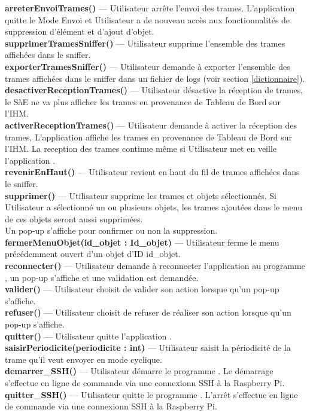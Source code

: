 \textbf{arreterEnvoiTrames()} --- Utilisateur arrête l'envoi des trames. L'application {\nomApplication} quitte le {\guillemotleft} Mode Envoi {\guillemotright} et Utilisateur a de nouveau accès aux fonctionnalités de suppression d'élément et d'ajout d'objet.\\
\textbf{supprimerTramesSniffer()} --- Utilisateur supprime l'ensemble des trames affichées dans le sniffer. \\
\textbf{exporterTramesSniffer()} --- Utilisateur demande à exporter l'ensemble des trames affichées dans le sniffer dans un fichier de logs (voir section \ref{dictionnaire}). \\
\textbf{desactiverReceptionTrames()} --- Utilisateur désactive la réception de trames, le SàE ne va plus afficher les trames en provenance de Tableau de Bord sur l'IHM. \\
\textbf{activerReceptionTrames()} --- Utilisateur demande à activer la réception des trames, L'application {\nomApplication} affiche les trames en provenance de Tableau de Bord sur l'IHM. La reception des trames continue même si Utilisateur met en veille l'application {\nomApplication}. \\
\textbf{revenirEnHaut()} --- Utilisateur revient en haut du fil de trames affichées dans le sniffer. \\
\textbf{supprimer()} --- Utilisateur supprime les trames et objets sélectionnés. Si Utilisateur a sélectionné un ou plusieurs objets, les trames ajoutées dans le menu de ces objets seront aussi supprimées. \\
Un pop-up s'affiche pour confirmer ou non la suppression. \\
\textbf{fermerMenuObjet(id\_objet : Id\_objet)} --- Utilisateur ferme le menu précédemment ouvert d'un objet d'ID id\_objet. \\
\textbf{reconnecter()} --- Utilisateur demande à reconnecter l'application {\nomApplication} au programme {\nomLogiciel}, un pop-up s'affiche et une validation est demandée. \\
\textbf{valider()} --- Utilisateur choisit de valider son action lorsque qu'un pop-up s'affiche. \\
\textbf{refuser()} --- Utilisateur choisit de refuser de réaliser son action lorsque qu'un pop-up s'affiche.\\
\textbf{quitter()} --- Utilisateur quitte l'application {\nomApplication}. \\
\textbf{saisirPeriodicite(periodicite : int)} --- Utilisateur saisit la périodicité de la trame qu'il veut envoyer en mode cyclique. \\
\textbf{demarrer\_SSH()} --- Utilisateur démarre le programme {\nomApplication}. Le démarrage s'effectue en ligne de commande via une connexionn SSH à la Raspberry Pi. \\
\textbf{quitter\_SSH()} --- Utilisateur quitte le programme {\nomApplication}. L'arrêt s'effectue en ligne de commande via une connexionn SSH à la Raspberry Pi. \\


